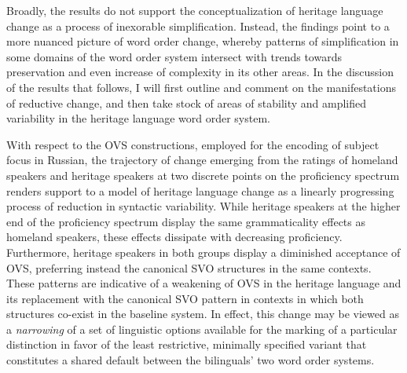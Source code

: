 \documentclass[output=paper]{langscibook}
\begin{document}
Broadly, the results do not support the conceptualization of heritage language change as a process of inexorable simplification. Instead, the findings point to a more nuanced picture of word order change, whereby patterns of simplification in some domains of the word order system intersect with trends towards preservation and even increase of complexity in its other areas. In the discussion of the results that follows, I will first outline and comment on the manifestations of reductive change, and then take stock of areas of stability and amplified variability in the heritage language word order system.

With respect to the OVS constructions, employed for the encoding of subject focus in Russian, the trajectory of change emerging from the ratings of homeland speakers and heritage speakers at two discrete points on the proficiency spectrum renders support to a model of heritage language change as a linearly progressing process of reduction in syntactic variability. While heritage speakers at the higher end of the proficiency spectrum display the same grammaticality effects as homeland speakers, these effects dissipate with decreasing proficiency. Furthermore, heritage speakers in both groups display a diminished acceptance of OVS, preferring instead the canonical SVO structures in the same contexts. These patterns are indicative of a weakening of OVS in the heritage language and its replacement with the canonical SVO pattern in contexts in which both structures co-exist in the baseline system. In effect, this change may be viewed as a \textit{narrowing} of a set of linguistic options available for the marking of a particular distinction in favor of the least restrictive, minimally specified variant that constitutes a shared default between the bilinguals’ two word order systems.
\end{document}
